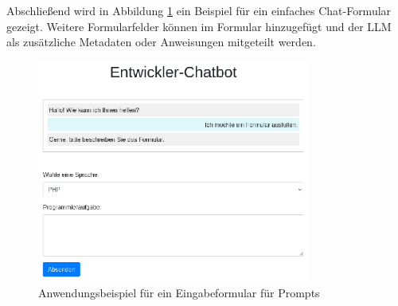 Abschließend wird in Abbildung \ref{img:example_chat_form} ein Beispiel für ein einfaches Chat-Formular gezeigt. Weitere Formularfelder können im Formular hinzugefügt und der LLM als zusätzliche Metadaten oder Anweisungen mitgeteilt werden.\vspace{0.2cm}

\begin{figure}[!ht]
	\includegraphics[width=0.8\textwidth]{content/chapter_discussion/images/chatbot_form_example.eps}
	\centering
	\caption{Anwendungsbeispiel für ein Eingabeformular für Prompts}
	\label{img:example_chat_form}
\end{figure}




